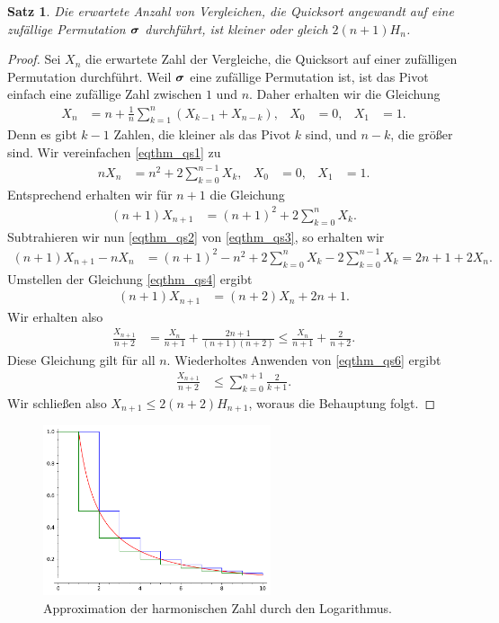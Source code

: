 \documentclass[10pt,reqno]{amsart}
\numberwithin{equation}{section}
\def\vec#1{\mathchoice{\mbox{\boldmath$\displaystyle#1$}}
{\mbox{\boldmath$\textstyle#1$}}
{\mbox{\boldmath$\scriptstyle#1$}}
{\mbox{\boldmath$\scriptscriptstyle#1$}}}
\newtheorem{theorem}[definition]{Satz}
\newcommand\bc[1]{\left({#1}\right)}
\begin{document}
\begin{theorem}\label{thm_qs}
	Die erwartete Anzahl von Vergleichen, die Quicksort angewandt auf eine zuf\"allige Permutation $\vec\sigma$ durchf\"uhrt, ist kleiner oder gleich $2(n+1)H_n$.
\end{theorem}
\begin{proof}
	Sei $X_n$ die erwartete Zahl der Vergleiche, die Quicksort auf einer zuf\"alligen Permutation durchf\"uhrt.
	Weil $\vec\sigma$ eine zuf\"allige Permutation ist, ist das Pivot einfach eine zuf\"allige Zahl zwischen $1$ und $n$.
	Daher erhalten wir die Gleichung
	\begin{align}\label{eqthm_qs1}
		X_n&=n+\frac1n\sum_{k=1}^n\bc{X_{k-1}+X_{n-k}},&X_0&=0,&X_1&=1.
	\end{align}
	Denn es gibt $k-1$ Zahlen, die kleiner als das Pivot $k$ sind, und $n-k$, die gr\"o\ss er sind.
	Wir vereinfachen \eqref{eqthm_qs1} zu
	\begin{align}\label{eqthm_qs2}
		nX_n&=n^2+2\sum_{k=0}^{n-1}X_{k},&X_0&=0,&X_1&=1.
	\end{align}
	Entsprechend erhalten wir f\"ur $n+1$ die Gleichung
	\begin{align}\label{eqthm_qs3}
		(n+1)X_{n+1}&=(n+1)^2+2\sum_{k=0}^{n}X_{k}.
	\end{align}
	Subtrahieren wir nun \eqref{eqthm_qs2} von \eqref{eqthm_qs3}, so erhalten wir
	\begin{align}\label{eqthm_qs4}
		(n+1)X_{n+1}-nX_n&=(n+1)^2-n^2+2\sum_{k=0}^{n}X_{k}-2\sum_{k=0}^{n-1}X_k=2n+1+2X_n.
	\end{align}
	Umstellen der Gleichung \eqref{eqthm_qs4} ergibt
	\begin{align}\label{eqthm_qs5}
		(n+1)X_{n+1}&=(n+2)X_n+2n+1.
	\end{align}
	Wir erhalten also
	\begin{align}\label{eqthm_qs6}
		\frac{X_{n+1}}{n+2}&=\frac{X_n}{n+1}+\frac{2n+1}{(n+1)(n+2)}\leq\frac{X_n}{n+1}+\frac{2}{n+2}.
	\end{align}
	Diese Gleichung gilt f\"ur all $n$.
	Wiederholtes Anwenden von \eqref{eqthm_qs6} ergibt
	\begin{align*}
		\frac{X_{n+1}}{n+2}&\leq\sum_{k=0}^{n+1}\frac2{k+1}.
	\end{align*}
	Wir schlie\ss en also $X_{n+1}\leq2(n+2)H_{n+1}$, woraus die Behauptung folgt.
\end{proof}

\begin{figure}
	\includegraphics[height=50mm]{images/harmonic.pdf}
	\caption{Approximation der harmonischen Zahl durch den Logarithmus.}\label{fig_harmonic}
\end{figure}
\end{document}
